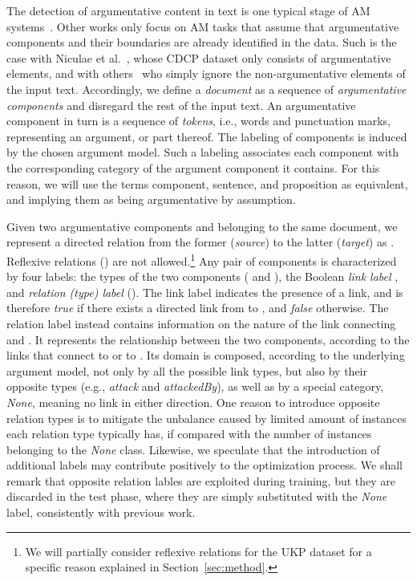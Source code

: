 \documentclass[journal]{IEEEtran}
\begin{document}
The detection of argumentative content in text is one typical stage of AM systems~\cite{TOIT2016}. Other works only focus on AM tasks that assume that argumentative components and their boundaries are  already identified in the data. Such is the case with Niculae et al.~\cite{DBLP:conf/acl/NiculaePC17}, whose CDCP dataset only consists of argumentative elements, and with others~\cite{lugini2020,peldszus2015annotated,D18-1402} who simply ignore the non-argumentative elements of the input text. Accordingly,
we define a \emph{document}  as a sequence of \emph{argumentative components} and disregard the rest of the input text. An argumentative component in turn is a sequence of \emph{tokens}, i.e., words and punctuation marks, representing an argument, or part thereof.
The labeling of components is induced by the chosen argument model. Such a labeling associates each component with the corresponding category  of the argument component it contains.
For this reason, we will use the terms component, sentence, and proposition as equivalent, and implying them as being argumentative by assumption.

Given two argumentative components  and  belonging to the same document, we represent a directed relation from the former (\emph{source}) to the latter (\emph{target}) as . Reflexive relations () are not allowed.\footnote{We will partially consider reflexive relations for the UKP dataset for a specific reason explained in Section~\ref{sec:method}.}
Any pair of components is characterized by four labels: the types of the two components ( and ), the Boolean \textit{link label} , and \textit{relation (type) label} ().
The link label indicates the presence of a link, and is therefore \emph{true} if there exists a directed link from  to , and \emph{false} otherwise.
The relation label instead contains information on the nature of the link connecting  and . It represents the relationship between the two components, according to the links that connect  to  or  to . Its domain is composed, according to the underlying argument model, not only by all the possible link types, but also by their opposite types (e.g., \textit{attack} and \textit{attackedBy}), as well as by a special category, \emph{None}, meaning no link in either direction.
One reason to introduce opposite relation types is to mitigate the unbalance caused by limited amount of instances each relation type typically has, if compared with the number of instances belonging to the \emph{None} class. Likewise, we speculate that the introduction of additional labels may contribute positively to the optimization process.
We shall remark that opposite relation lables are exploited during training, but they are discarded in the test phase, where they are simply substituted with the \emph{None} label,  consistently with previous work. 
\end{document}
